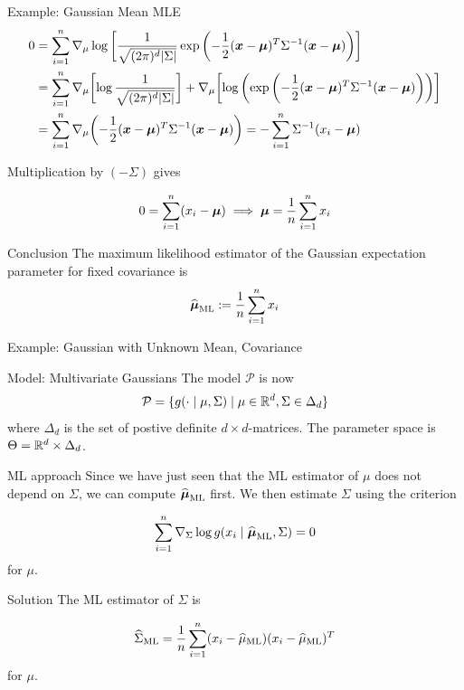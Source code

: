 \documentclass[10pt]{beamer}
\newcommand{\bp}[1]{\bigg(  {#1} \bigg)}
\newcommand{\bb}[1]{\bigg[  {#1} \bigg]}
\begin{document}
\begin{frame}{Example: Gaussian Mean MLE}
\footnotesize
\begin{align*}
0 &= \ds\sum_{i=1}^n  \nabla_\mu  \log \bb{\df{1}{\sqrt{(2 \pi)^d |\Sigma| }} \exp \bp{ - \df{1}{2} (\+x - \+\mu)^T \Sigma^{-1} ( \+x - \+\mu)}}   \\
&=  \ds\sum_{i=1}^n   \nabla_\mu  \bb{\log \df{1}{\sqrt{(2 \pi)^d |\Sigma| }}} +\nabla_\mu \bb{ \log \bp{\exp \bp{ - \df{1}{2} (\+x - \+\mu)^T \Sigma^{-1} ( \+x - \+\mu)} }} \\
&=  \ds\sum_{i=1}^n \nabla_\mu \bp{ - \df{1}{2} (\+x - \+\mu)^T \Sigma^{-1} ( \+x - \+\mu)}  = -  \ds\sum_{i=1}^n \Sigma^{-1} (x_i - \+\mu) 
\end{align*}

Multiplication by $(- \Sigma)$ gives

\[  0 = \displaystyle\sum_{i=1}^n (x_i - {\boldsymbol \mu}) \implies {\boldsymbol \mu} = \displaystyle\frac{1}{n} \displaystyle\sum_{i=1}^n x_i\]

\begin{sblock}{Conclusion}
The maximum likelihood estimator of the Gaussian expectation parameter for fixed covariance is 
\[ \widehat{{\boldsymbol \mu}}_{\text{ML}} := \displaystyle\frac{1}{n} \displaystyle\sum_{i=1}^n x_i \]
\end{sblock}

\end{frame}


\begin{frame}{Example: Gaussian with Unknown Mean, Covariance}
\footnotesize
\begin{sblock}{Model: Multivariate Gaussians}
The model $\mathcal{P}$ is now
\[ \mathcal{P} = \{ {g(\cdot \; | \; \mu, \Sigma) \; | \; \mu \in \mathbb{R}^d, \Sigma \in \Delta_d} \} \]
where $\Delta_d$ is the set of postive definite $d \times d$-matrices. The parameter space is $\Theta = \mathbb{R}^d \times \Delta_d$.
\end{sblock}

\begin{sblock}{ML approach}
Since we have just seen that the ML estimator of $\mu$ does not depend on $\Sigma$, we can compute $\widehat{{\boldsymbol \mu}}_\text{ML}$ first. We then estimate $\Sigma$ using the criterion

\[ \displaystyle\sum_{i=1}^n \nabla_\Sigma \log g(x_i \; | \; \widehat{{\boldsymbol \mu}}_\text{ML}, \Sigma) = 0 \]
for $\mu$.
\end{sblock}

\begin{sblock}{Solution}
The ML estimator of $\Sigma$ is 

\[  \widehat{\Sigma}_\text{ML} = \displaystyle\frac{1}{n} \displaystyle\sum_{i=1}^n (x_i -  \widehat{\mu}_\text{ML}) (x_i - \widehat{\mu}_\text{ML})^T \]
for $\mu$.
\end{sblock}

\end{frame}
\end{document}
